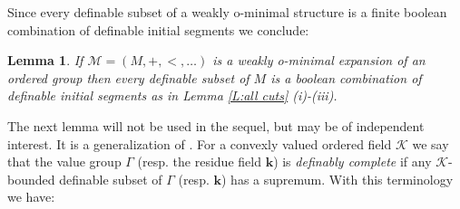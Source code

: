 \documentclass[11pt]{amsart}
\newtheorem{lemma}[theorem]{Lemma}
\theoremstyle{definition}
\newcommand{\bk}{\textbf{k}}
\newcommand{\CK}{{\mathcal K}}
\newcommand{\CM}{{\mathcal M}}
\newcommand{\0}{\emptyset}
\begin{document}
Since every definable subset of a weakly o-minimal structure is a finite boolean combination of definable initial segments we conclude:

\begin{lemma}\label{L: definable sets in wom}
	If $\CM=(M,+,<,\dots)$ is a weakly o-minimal expansion of an ordered group then every definable subset of $M$ is a boolean combination of definable initial segments as in Lemma \ref{L:all cuts} (i)-(iii).
\end{lemma}
 

The next lemma will not be used in the sequel, but may be of independent interest. It is a generalization of \cite[Lemma 3.1]{HaHaPeSs}. For a convexly valued ordered field $\CK$ we say that the value group $\Gamma$ (resp. the residue field $\bk$) is \emph{definably complete} if any $\CK$-bounded definable subset of $\Gamma$ (resp. $\bk$) has a supremum. With this terminology we have: 
\end{document}
